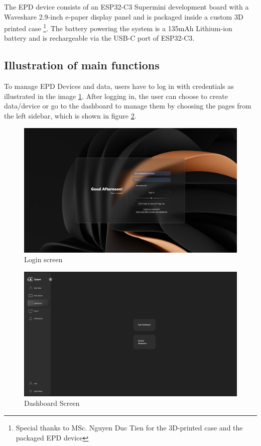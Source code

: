\documentclass[../Main.tex]{subfiles}
\begin{document}
The \gls{EPD} device consists of an ESP32-C3 Supermini development board with a Waveshare 2.9-inch e-paper display panel and is packaged inside a custom 3D printed case \footnote{Special thanks to MSc. Nguyen Duc Tien for the 3D-printed case and the packaged EPD device}. The battery powering the system is a 135mAh Lithium-ion battery and is rechargeable via the USB-C port of ESP32-C3.

\subsection{Illustration of main functions}
To manage \gls{EPD} Devices and data, users have to log in with credentials as illustrated in the image \ref{fig:login-screen}. After logging in, the user can choose to create data/device or go to the dashboard to manage them by choosing the pages from the left sidebar, which is shown in figure \ref{fig:dashboard}. 
\begin{figure}[H]
    \centering
    \includegraphics[width=0.8\linewidth]{doc//imgs/ui_login.png}
    \caption{Login screen}
    \label{fig:login-screen}
\end{figure}

\begin{figure}[H]
    \centering
    \includegraphics[width=0.8\linewidth]{doc//imgs/ui_dashboard.png}

    \caption{Dashboard Screen}
    \label{fig:dashboard}
\end{figure}
\end{document}
